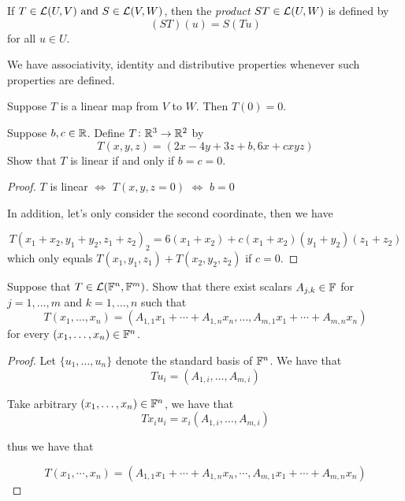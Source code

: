 \documentclass{extarticle}
\begin{document}
\begin{definition}
    If \(T \in \mathcal{L}(U, V) \text{ and } S \in \mathcal{L}(V, W) \), then the \emph{product} \(ST \in \mathcal{L}(U, W)\)
    is defined by 
    \[(ST)(u) = S(Tu)\]
    for all \(u \in U\).
\end{definition}

\begin{remark}
We have associativity, identity and distributive properties whenever such properties are defined. 
\end{remark}

\begin{thm}
    Suppose \(T\) is a linear map from \(V\) to \(W\). Then \(T(0) = 0\). 
\end{thm}

\newpage 
{}
\begin{problem}{1}
    Suppose \(b, c \in \mathbb{R}\). Define \(T \colon \mathbb{R}^3 \to \mathbb{R}^2\) by 
    \[T(x,y,z) = (2x - 4y + 3z + b, 6x + cxyz)\]
    Show that \(T\) is linear if and only if \(b = c = 0\). 
\end{problem}

\begin{proof}
\(T\) is linear \(\Leftrightarrow\) \(T(x, y, z = 0)\)
\(\Leftrightarrow\) \(b = 0\)

In addition, let's only consider the second coordinate, then we have 

\[T(x_1 + x_2, y_1 + y_2, z_1 + z_2)_2 = 6(x_1 + x_2) + c(x_1 + x_2)(y_1 + y_2)(z_1 + z_2)\]
which only equals \(T(x_1, y_1, z_1) + T(x_2, y_2, z_2)\) if \(c = 0\). 
\end{proof}

\begin{problem}{3}
    Suppose that \(T \in \mathcal{L}(\mathbb{F}^n, \mathbb{F}^m)\). Show that there exist scalars 
    \(A_{j,k} \in \mathbb{F}\) for \(j = 1, \ldots, m\) and \(k=1, \ldots,n\) such that 
    \[T(x_1, \ldots, x_n) = (A_{1,1}x_1 + \cdots+A_{1,n} x_n, \ldots, A_{m, 1} x_1 + \cdots + A_{m,n}x_n)\]
    for every \((x_1, \ldots, x_n) \in \mathbb{F}^n\). 
\end{problem}

\begin{proof}
Let \(\{u_1, \ldots, u_n\}\) denote the standard basis of \(\mathbb{F}^n\). We have that 
\[T u_i = (A_{1,i}, \ldots, A_{m, i})\]

Take arbitrary \((x_1, \ldots, x_n) \in \mathbb{F}^n\), we have that 
\[T x_i u_i = x_i (A_{1,i}, \ldots, A_{m, i})\]

thus we have that 

\[T(x_1, \cdots, x_n) = (A_{1,1} x_1 + \cdots + A_{1,n} x_n, \cdots, A_{m, 1}x_1 + \cdots + A_{m, n} x_n)\]

\end{proof}
\end{document}
